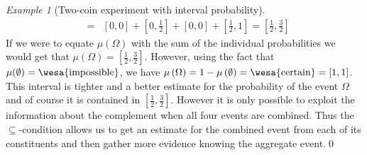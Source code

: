 \documentclass{article}
\theoremstyle{remark}
\newtheorem{example}{Example}
\newcommand{\pmeas}{\ensuremath{\mu}}
\newcommand{\imposs}{{\mbox{\wesa{impossible}}}}
\newcommand{\necess}{{\mbox{\wesa{certain}}}}
\newcommand{\yutsung}[1]{\fbox{\begin{minipage}{0.9\textwidth}\color{purple}{Yu-Tsung says: #1}\end{minipage}}}
\newcommand{\gerardo}[1]{\fbox{\begin{minipage}{0.9\textwidth}\color{OliveGreen}{Gerardo says: #1}\end{minipage}}}
\begin{document}
\begin{example}[Two-coin experiment with interval probability]
\begin{eqnarray*}
 & = & \left[0,0\right]+\left[0,\frac{1}{2}\right]+\left[0,0\right]+\left[\frac{1}{2},1\right]=\left[\frac{1}{2},\frac{3}{2}\right]
\end{eqnarray*}
If we were to equate $\pmeas(\Omega)$ with the sum of the individual
probabilities we would get that
$\pmeas(\Omega) = \left[\frac{1}{2},\frac{3}{2}\right]$. However,
using the fact that $\pmeas(\emptyset)=\imposs$, we have
$\pmeas\left(\Omega\right)=1-\pmeas\left(\emptyset\right)=\necess=[1,1]$. This
interval is tighter and a better estimate for the probability of the
event $\Omega$ and of course it is contained in
$[\frac{1}{2},\frac{3}{2}]$. However it is only possible to exploit
the information about the complement when all four events are
combined. Thus the $\subseteq$-condition allows us to get an estimate
for the combined event from each of its constituents and then gather
more evidence knowing the aggregate event.\qed\end{example}




\end{document}
